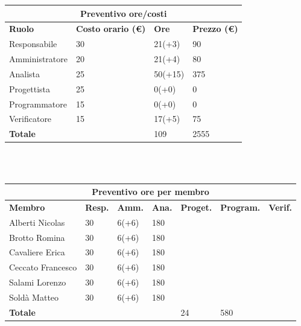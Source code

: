 \documentclass[a4paper, 12pt]{article}
\begin{document}
\begin{center}
	\begin{tabularx}{\textwidth}{|X|X|X|X|}
		\hline
		\multicolumn{4}{|c|}{\textbf{Preventivo ore/costi}}                                      \\
		\hline
		\hline
		\textbf{Ruolo}  & \textbf{Costo orario (\euro)} & \textbf{Ore} & \textbf{Prezzo (\euro)} \\
		\hline
		Responsabile    & 30                            & 21(+3)       & 90                      \\
		\hline
		Amministratore  & 20                            & 21(+4)       & 80                      \\
		\hline
		Analista        & 25                            & 50(+15)      & 375                     \\
		\hline
		Progettista     & 25                            & 0(+0)        & 0                       \\
		\hline
		Programmatore   & 15                            & 0(+0)        & 0                       \\
		\hline
		Verificatore    & 15                            & 17(+5)       & 75                      \\
		\hline
		\hline
		\textbf{Totale} &                               & 109          & 2555                    \\
		\hline
	\end{tabularx}\\[8pt]
	\mbox{}\\
\end{center}

\begin{center}
	\begin{tabularx}{\textwidth}{|X|X|X|X|X|X|X|}
		\hline
		\multicolumn{7}{|c|}{\textbf{Preventivo ore per membro}}                                      \\
		\hline
		\hline
		\textbf{Membro}  & \textbf{Resp.} & \textbf{Amm.} & \textbf{Ana.} &
		\textbf{Proget.} & \textbf{Program.} & \textbf{Verif.} \\
		\hline
		Alberti Nicolas    	& 30 	& 6(+6)       & 180  & &  &                 \\
		\hline
		Brotto Romina    	& 30 	& 6(+6)       & 180  & &  &                 \\
		\hline
		Cavaliere Erica    	& 30 	& 6(+6)       & 180  & &  &                 \\
		\hline
		Ceccato Francesco    	& 30 	& 6(+6)       & 180  & &   &                \\
		\hline
		Salami Lorenzo    	& 30 	& 6(+6)       & 180  & &     &               \\
		\hline
		Soldà Matteo    	& 30 	& 6(+6)       & 180  & &   &                 \\
		\hline
		\hline
		\textbf{Totale} &    & & & 24           & 580      &               \\
		\hline
	\end{tabularx}\\[8pt]
	\mbox{}\\
\end{center}
\end{document}
